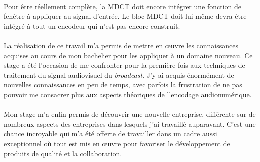 \documentclass{article}
\begin{document}
    \paragraph{}
    Pour être réellement complète, la MDCT doit encore intégrer une fonction de fenêtre à appliquer au signal d'entrée. Le bloc MDCT doit lui-même devra être intégré à tout un encodeur qui n'est pas encore construit.

    \paragraph{}
    La réalisation de ce travail m'a permis de mettre en \oe uvre les connaissances acquises au cours de mon bachelier pour les appliquer à un domaine nouveau. Ce stage a été l'occasion de me confronter pour la première fois aux techniques de traitement du signal audiovisuel du \emph{broadcast}. J'y ai acquis énormément de nouvelles connaissances en peu de temps, avec parfois la frustration de ne pas pouvoir me consacrer plus aux aspects théoriques de l'encodage audionumérique.

    \paragraph{}
    Mon stage m'a enfin permis de découvrir une nouvelle entreprise, différente sur de nombreux aspects des entreprises dans lesquels j'ai travaillé auparavant. C'est une chance incroyable qui m'a été offerte de travailler dans un cadre aussi exceptionnel où tout est mis en \oe uvre pour favoriser le développement de produits de qualité et la collaboration.



    \newpage
    
    

    
\end{document}

